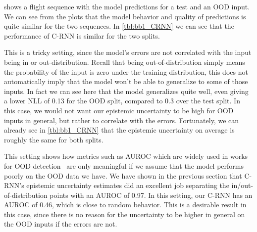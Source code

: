  shows a flight sequence with the model predictions for a test and an OOD input. We can see from the plots that the model behavior and quality of predictions is quite similar for the two sequences. In \cref{tbl:bb1_CRNN} we can see that the performance of C-RNN is similar for the two splits.

This is a tricky setting, since the model's errors are not correlated with the input being in or out-distribution. Recall that being out-of-distribution simply means the probability of the input is zero under the training distribution, this does not automatically imply that the model won't be able to generalize to some of those inputs. In fact we can see here that the model generalizes quite well, even giving a lower NLL of 0.13 for the OOD split, compared to 0.3 over the test split. In this case, we would not want our epistemic uncertainty to be high for OOD inputs in general, but rather to correlate with the errors. 
Fortunately, we can already see in \cref{tbl:bb1_CRNN} that the epistemic uncertainty on average is roughly the same for both splits. 

This setting shows how metrics such as AUROC which are widely used in works for OOD detection~\citep{liang2017enhancing, hein2019relu, lee2017training} are only meaningful if we assume that the model performs poorly on the OOD data we have. We have shown in the previous section that C-RNN's epistemic uncertainty estimates did an excellent job separating the in/out-of-distribution points with an AUROC of 0.97. In this setting, our C-RNN has an AUROC of 0.46, which is close to random behavior. This is a desirable result in this case, since there is no reason for the uncertainty to be higher in general on the OOD inputs if the errors are not.



